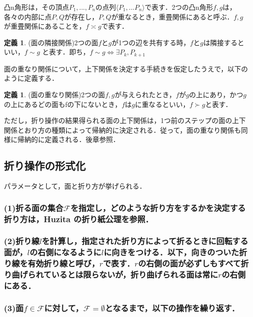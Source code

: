 \documentclass[uplatex,dvipdfmx,ja=standard]{bxjsarticle}
\theoremstyle{definition}
\newtheorem{definition}[theorem]{定義}
\numberwithin{theorem}{section}  %
\numberwithin{equation}{section} %
\begin{document}
凸n角形は，その頂点$P_1 , ... ,P_n$の点列$\langle P_1 , ... P_n \rangle$で表す．2つの凸n角形$f,g$は，各々の内部に点$P,Q$が存在し，$P,Q$が重なるとき，重畳関係にあると呼ぶ．$f,g$が重畳関係にあることを，$f \asymp g$で表す．

\begin{definition}
    (面の隣接関係)2つの面$f$と$g$が1つの辺を共有する時，$f$と$g$は隣接するといい，$f \sim g$ と表す．即ち，$f \sim g \iff \exists P_k , P_{k+1}$
\end{definition}

面の重なり関係について，上下関係を決定する手続きを仮定したうえで，以下のように定義する．

\begin{definition}
    (面の重なり関係)2つの面$f,g$が与えられたとき，$f$が$g$の上にあり，かつ$g$の上にあるどの面もfの下にないとき，$f$は$g$に重なるといい，$f \succ g$と表す．
\end{definition}

ただし，折り操作の結果得られる面の上下関係は，1つ前のステップの面の上下関係とおり方の種類によって帰納的に決定される．従って，面の重なり関係も同様に帰納的に定義される．後章参照．

\subsection{折り操作の形式化}

パラメータとして，面と折り方が挙げられる．


\subsubsection*{\rm{(1)折る面の集合$\mathcal{F}$を指定し，どのような折り方をするかを決定する折り方は，Huzita の折り紙公理を参照．}}

\subsubsection*{\rm{(2)折り線$l$を計算し，指定された折り方によって折るときに回転する面が，$l$の右側になるように$l$に向きをつける．以下，向きのついた折り線を有効折り線と呼び，$r$で表す．$r$の右側の面が必ずしもすべて折り曲げられているとは限らないが，折り曲げられる面は常に$r$の右側にある．}}

\subsubsection*{\rm{(3)面$f \in \mathcal{F}$に対して，$\mathcal{F} = \emptyset$となるまで，以下の操作を繰り返す．}}
\end{document}
